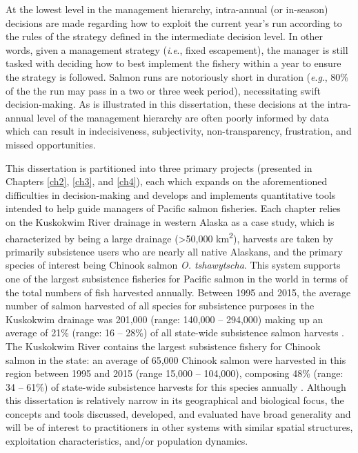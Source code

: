 \documentclass[12pt,]{book}
\theoremstyle{definition}
\theoremstyle{definition}
\theoremstyle{definition}
\theoremstyle{remark}
\begin{document}
At the lowest level in the management hierarchy, intra-annual (or
in-season) decisions are made regarding how to exploit the current
year's run according to the rules of the strategy defined in the
intermediate decision level. In other words, given a management strategy
(\emph{i}.\emph{e}., fixed escapement), the manager is still tasked with
deciding how to best implement the fishery within a year to ensure the
strategy is followed. Salmon runs are notoriously short in duration
(\emph{e}.\emph{g}., 80\% of the the run may pass in a two or three week
period), necessitating swift decision-making. As is illustrated in this
dissertation, these decisions at the intra-annual level of the
management hierarchy are often poorly informed by data which can result
in indecisiveness, subjectivity, non-transparency, frustration, and
missed opportunities.

This dissertation is partitioned into three primary projects (presented
in Chapters \ref{ch2}, \ref{ch3}, and \ref{ch4}), each which expands on
the aforementioned difficulties in decision-making and develops and
implements quantitative tools intended to help guide managers of Pacific
salmon fisheries. Each chapter relies on the Kuskokwim River drainage in
western Alaska as a case study, which is characterized by being a large
drainage (\textgreater{}50,000 km\textsuperscript{2}), harvests are
taken by primarily subsistence users who are nearly all native Alaskans,
and the primary species of interest being Chinook salmon \emph{O.
tshawytscha}. This system supports one of the largest subsistence
fisheries for Pacific salmon in the world in terms of the total numbers
of fish harvested annually. Between 1995 and 2015, the average number of
salmon harvested of all species for subsistence purposes in the
Kuskokwim drainage was 201,000 (range: 140,000 -- 294,000) making up an
average of 21\% (range: 16 -- 28\%) of all state-wide subsistence salmon
harvests \citep[data reported in annual reports, most recently
in][]{fall-etal-2018}. The Kuskokwim River contains the largest
subsistence fishery for Chinook salmon in the state: an average of
65,000 Chinook salmon were harvested in this region between 1995 and
2015 (range 15,000 -- 104,000), composing 48\% (range: 34 -- 61\%) of
state-wide subsistence harvests for this species annually
\citep{fall-etal-2018}. Although this dissertation is relatively narrow
in its geographical and biological focus, the concepts and tools
discussed, developed, and evaluated have broad generality and will be of
interest to practitioners in other systems with similar spatial
structures, exploitation characteristics, and/or population dynamics.
\end{document}

